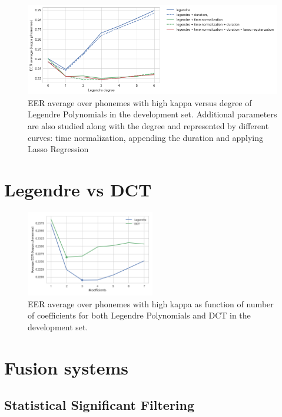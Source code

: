 \begin{figure}[H]
	\centering
	\includegraphics[width=1.0\textwidth]{files/figures/results/legendre-dct/legendre-tunning.png}
	\caption{EER average over phonemes with high kappa versus degree of Legendre Polynomials in
	the development set. Additional parameters are also studied along with the degree and 
	represented by different curves: time normalization, appending the duration and applying
	Lasso Regression}
	\label{fig:legendreTunning}
\end{figure}


\section{Legendre vs DCT}

\begin{figure}[H]
	\centering
	\includegraphics[width=0.5\textwidth]{files/figures/results/legendre-dct/legendre-dct-coefficients.png}
	\caption{EER average over phonemes with high kappa as function of number of coefficients
	for both Legendre Polynomials and DCT in the development set.}
	\label{fig:legendreVsDCT}
\end{figure}


\section{Fusion systems}

\subsection{Statistical Significant Filtering}

